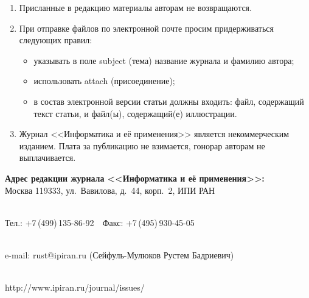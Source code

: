{\begin{enumerate}[1.]
{\noindent
\textbf{Описание патента:}

. 
2006. Sposob orientirovaniya po krenu letatel'nogo 
apparata s opti\-che\-skoy golovkoy 
samonavedeniya [The way to orient on the roll of aircraft with optical homing head]. 
Patent RF No.\,2280590.
}

\item Присланные в редакцию материалы авторам не возвращаются.\\[-13.5pt]  

\item При отправке файлов по электронной почте просим придерживаться следующих 
правил: 
\begin{itemize}
\item указывать в поле subject (тема) название журнала и фамилию автора;\\[-13.5pt] 
\item использовать attach (присоединение);\\[-13.5pt] 
\item в состав электронной версии статьи должны входить: файл, содержащий текст 
статьи, и файл(ы), содержащий(е) иллюстрации.\\[-13.5pt] 
\end{itemize}

\item Журнал <<Информатика и её применения>> является некоммерческим изданием. 
Плата за публикацию не взимается, гонорар авторам не выплачивается. 
\end{enumerate}

\thispagestyle{empty}



\begin{center}

\textbf{Адрес редакции журнала <<Информатика и её применения>>:} \\




Москва 119333, ул.~Вавилова, д.~44, корп.~2, ИПИ РАН\\[-10pt]

\

Тел.: +7\,(499)\,135-86-92\ \ Факс:  +7\,(495)\,930-45-05\\[-10pt]
 
 \

e-mail:   {\sf rust@ipiran.ru} (Сейфуль-Мулюков Рустем Бадриевич)\\[-10pt]

\

{\sf http://www.ipiran.ru/journal/issues/}
\end{center}
}